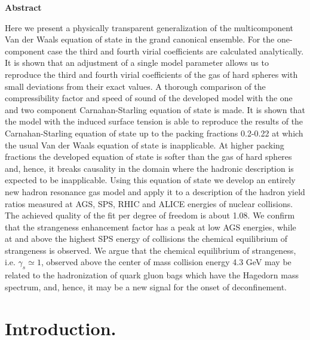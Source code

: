 \documentclass[12pt]{article}
\begin{document}
\centerline{\bf Abstract}
Here we present a physically transparent generalization of the multicomponent Van der Waals equation of state in the grand canonical ensemble. For the one-component case the third and fourth virial coefficients are calculated analytically. It is shown that an adjustment of  a single model parameter allows us  to reproduce  the third and fourth virial coefficients of the gas of hard spheres  with small deviations from their exact values. A thorough comparison of the compressibility factor and speed of sound of the developed model with the one and two component Carnahan-Starling equation of state is made. It is shown that  the model with the induced surface tension is able to reproduce the results of the  Carnahan-Starling equation of state up to the packing fractions 0.2-0.22 at which the usual  Van der Waals equation of state is inapplicable.  At higher packing fractions the developed equation of state is  softer than the gas of hard spheres and, hence,  it breaks causality in the domain where the hadronic description is expected to be inapplicable. Using this equation of state  we develop an entirely new hadron resonance gas model and apply it to a description of the hadron yield ratios measured at  AGS, SPS, RHIC and ALICE  energies of nuclear collisions.  The achieved quality of the fit  per degree of freedom is about 1.08.  We confirm that the strangeness enhancement factor has a peak at low AGS energies, while at and above the highest  SPS energy of collisions the chemical equilibrium of strangeness is observed. We argue that the chemical equilibrium of strangeness, i.e. $\gamma_s \simeq 1$,   observed  above  the center of mass collision energy 4.3 GeV may be related to the hadronization of quark gluon bags which have the Hagedorn mass spectrum, and, hence, it may be a new signal  for  the onset of deconfinement.



\vskip5mm

\section{Introduction.} 
\end{document}
